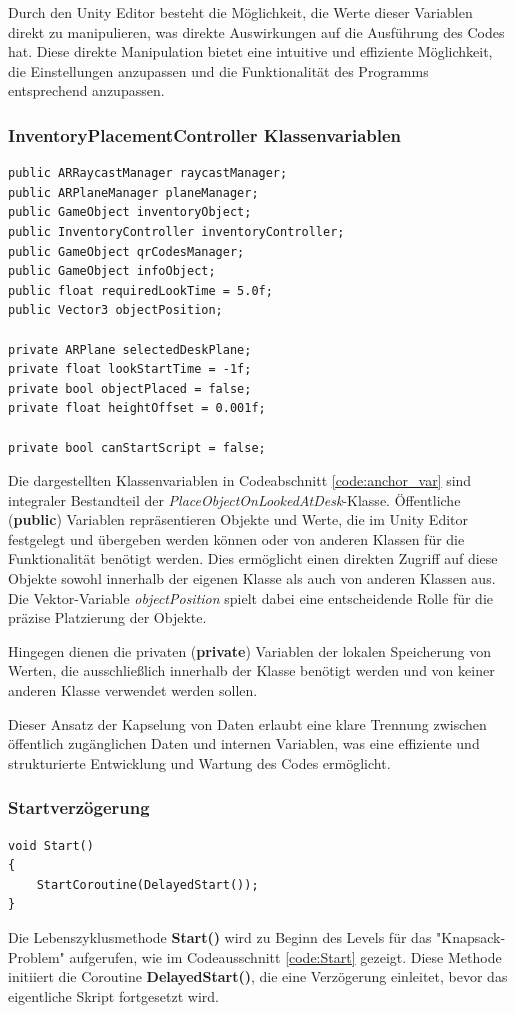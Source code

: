 Durch den Unity Editor besteht die Möglichkeit, die Werte dieser Variablen direkt zu manipulieren, was direkte Auswirkungen
auf die Ausführung des Codes hat. Diese direkte Manipulation bietet eine intuitive und effiziente Möglichkeit, die
Einstellungen anzupassen und die Funktionalität des Programms entsprechend anzupassen.

\subsubsection{InventoryPlacementController Klassenvariablen}
\begin{lstlisting}[style=csharp, caption={Klassenvariablen der InventoryPlacementController Klasse}, label=code:anchor_var]
public ARRaycastManager raycastManager;
public ARPlaneManager planeManager;
public GameObject inventoryObject;
public InventoryController inventoryController;
public GameObject qrCodesManager;
public GameObject infoObject;
public float requiredLookTime = 5.0f;
public Vector3 objectPosition;

private ARPlane selectedDeskPlane;
private float lookStartTime = -1f;
private bool objectPlaced = false;
private float heightOffset = 0.001f;

private bool canStartScript = false;
\end{lstlisting}

Die dargestellten Klassenvariablen in Codeabschnitt \ref{code:anchor_var} sind integraler Bestandteil der
\textit{PlaceObjectOnLookedAtDesk}-Klasse. Öffentliche (\textbf{public}) Variablen repräsentieren Objekte und Werte, die
im Unity Editor festgelegt und übergeben werden können oder von anderen Klassen für die Funktionalität benötigt werden.
Dies ermöglicht einen direkten Zugriff auf diese Objekte sowohl innerhalb der eigenen Klasse als auch von anderen Klassen
aus. Die Vektor-Variable \textit{objectPosition} spielt dabei eine entscheidende Rolle für die präzise Platzierung der
Objekte.

Hingegen dienen die privaten (\textbf{private}) Variablen der lokalen Speicherung von Werten, die ausschließlich innerhalb
der Klasse benötigt werden und von keiner anderen Klasse verwendet werden sollen.

Dieser Ansatz der Kapselung von Daten erlaubt eine klare Trennung zwischen öffentlich zugänglichen Daten und internen
Variablen, was eine effiziente und strukturierte Entwicklung und Wartung des Codes ermöglicht.

\subsubsection{Startverzögerung}
\begin{lstlisting}[style=csharp, caption={Beginn des Inventory Placement Controllers}, label=code:Start]
void Start()
{
    StartCoroutine(DelayedStart());
}
\end{lstlisting}
Die Lebenszyklusmethode \textbf{Start()} wird zu Beginn des Levels für das "Knapsack-Problem" aufgerufen, wie im
Codeausschnitt \ref{code:Start} gezeigt. Diese Methode initiiert die Coroutine \textbf{DelayedStart()}, die eine Verzögerung
einleitet, bevor das eigentliche Skript fortgesetzt wird.

